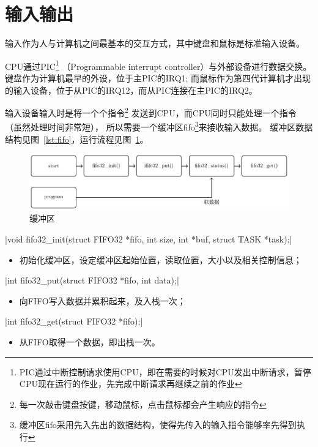 \section{输入输出}
输入作为人与计算机之间最基本的交互方式，其中键盘和鼠标是标准输入设备。

CPU通过PIC\footnote{PIC通过中断控制请求使用CPU，即在需要的时候对CPU发出中断请求，暂停CPU现在运行的作业，先完成中断请求再继续之前的作业}
（Programmable interrupt controller）与外部设备进行数据交换。
键盘作为计算机最早的外设，位于主PIC的IRQ1;
而鼠标作为第四代计算机才出现的输入设备，位于从PIC的IRQ12，而从PIC连接在主PIC的IRQ2。

输入设备输入时是将一个个指令\footnote{每一次敲击键盘按键，移动鼠标，点击鼠标都会产生响应的指令}
发送到CPU，而CPU同时只能处理一个指令（虽然处理时间非常短），
所以需要一个缓冲区fifo\footnote{缓冲区fifo采用先入先出的数据结构，使得先传入的输入指令能够率先得到执行}来接收输入数据。
缓冲区数据结构见图~\ref{lst:fifo}，运行流程见图~\ref{fig:fifo}。

\begin{figure}[H]
    \centering
    \includegraphics[width=\textwidth]{fig/func/fifo.pdf}
    \caption{缓冲区}
    \label{fig:fifo}
\end{figure}

\csingle|void fifo32_init(struct FIFO32 *fifo, int size, int *buf, struct TASK *task);|
\begin{itemize}
  \item 初始化缓冲区，设定缓冲区起始位置，读取位置，大小以及相关控制信息；
\end{itemize}

\csingle|int fifo32_put(struct FIFO32 *fifo, int data);|
\begin{itemize}
  \item 向FIFO写入数据并累积起来，及入栈一次；
\end{itemize}

\csingle|int fifo32_get(struct FIFO32 *fifo);|
\begin{itemize}
  \item 从FIFO取得一个数据，即出栈一次。\\
\end{itemize}

